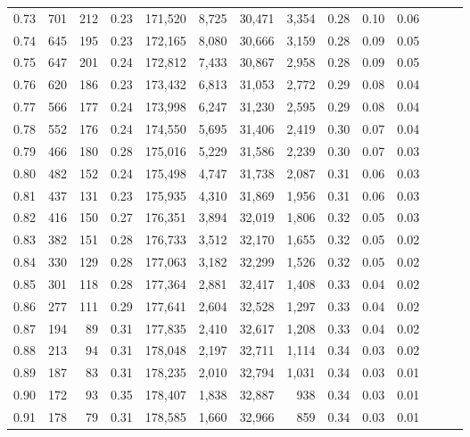 \begin{tabular}{rrrrrrrrrrrrrr}
0.73 &    701 &  212 &  0.23 &  171,520 &    8,725 &  30,471 &   3,354 &  0.28 &  0.10 &      0.06 \\
0.74 &    645 &  195 &  0.23 &  172,165 &    8,080 &  30,666 &   3,159 &  0.28 &  0.09 &      0.05 \\
0.75 &    647 &  201 &  0.24 &  172,812 &    7,433 &  30,867 &   2,958 &  0.28 &  0.09 &      0.05 \\
0.76 &    620 &  186 &  0.23 &  173,432 &    6,813 &  31,053 &   2,772 &  0.29 &  0.08 &      0.04 \\
0.77 &    566 &  177 &  0.24 &  173,998 &    6,247 &  31,230 &   2,595 &  0.29 &  0.08 &      0.04 \\
0.78 &    552 &  176 &  0.24 &  174,550 &    5,695 &  31,406 &   2,419 &  0.30 &  0.07 &      0.04 \\
0.79 &    466 &  180 &  0.28 &  175,016 &    5,229 &  31,586 &   2,239 &  0.30 &  0.07 &      0.03 \\
0.80 &    482 &  152 &  0.24 &  175,498 &    4,747 &  31,738 &   2,087 &  0.31 &  0.06 &      0.03 \\
0.81 &    437 &  131 &  0.23 &  175,935 &    4,310 &  31,869 &   1,956 &  0.31 &  0.06 &      0.03 \\
0.82 &    416 &  150 &  0.27 &  176,351 &    3,894 &  32,019 &   1,806 &  0.32 &  0.05 &      0.03 \\
0.83 &    382 &  151 &  0.28 &  176,733 &    3,512 &  32,170 &   1,655 &  0.32 &  0.05 &      0.02 \\
0.84 &    330 &  129 &  0.28 &  177,063 &    3,182 &  32,299 &   1,526 &  0.32 &  0.05 &      0.02 \\
0.85 &    301 &  118 &  0.28 &  177,364 &    2,881 &  32,417 &   1,408 &  0.33 &  0.04 &      0.02 \\
0.86 &    277 &  111 &  0.29 &  177,641 &    2,604 &  32,528 &   1,297 &  0.33 &  0.04 &      0.02 \\
0.87 &    194 &   89 &  0.31 &  177,835 &    2,410 &  32,617 &   1,208 &  0.33 &  0.04 &      0.02 \\
0.88 &    213 &   94 &  0.31 &  178,048 &    2,197 &  32,711 &   1,114 &  0.34 &  0.03 &      0.02 \\
0.89 &    187 &   83 &  0.31 &  178,235 &    2,010 &  32,794 &   1,031 &  0.34 &  0.03 &      0.01 \\
0.90 &    172 &   93 &  0.35 &  178,407 &    1,838 &  32,887 &     938 &  0.34 &  0.03 &      0.01 \\
0.91 &    178 &   79 &  0.31 &  178,585 &    1,660 &  32,966 &     859 &  0.34 &  0.03 &      0.01 \\

\end{tabular}
